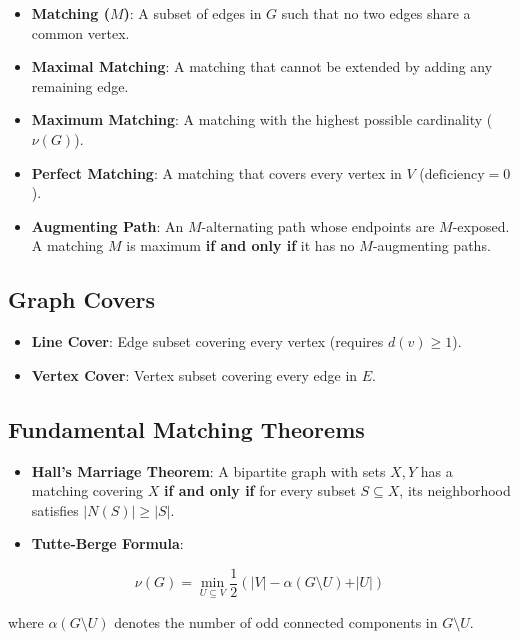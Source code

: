 \documentclass[
]{book}
\theoremstyle{definition}
\theoremstyle{definition}
\theoremstyle{definition}
\theoremstyle{definition}
\theoremstyle{remark}
\begin{document}
\begin{itemize}
\item
  \textbf{Matching (\(M\))}: A subset of edges in \(G\) such that no two edges share a common vertex.
\item
  \textbf{Maximal Matching}: A matching that cannot be extended by adding any remaining edge.
\item
  \textbf{Maximum Matching}: A matching with the highest possible cardinality (\(\nu(G)\)).
\item
  \textbf{Perfect Matching}: A matching that covers every vertex in \(V\) (\(\text{deficiency} = 0\)).
\item
  \textbf{Augmenting Path}: An \(M\)-alternating path whose endpoints are \(M\)-exposed. A matching \(M\) is maximum \textbf{if and only if} it has no \(M\)-augmenting paths.
\end{itemize}

\subsection{Graph Covers}\label{graph-covers}

\begin{itemize}
\item
  \textbf{Line Cover}: Edge subset covering every vertex (requires \(d(v) \ge 1\)).
\item
  \textbf{Vertex Cover}: Vertex subset covering every edge in \(E\).
\end{itemize}

\subsection{Fundamental Matching Theorems}\label{fundamental-matching-theorems}

\begin{itemize}
\item
  \textbf{Hall's Marriage Theorem}: A bipartite graph with sets \(X, Y\) has a matching covering \(X\) \textbf{if and only if} for every subset \(S \subseteq X\), its neighborhood satisfies \(\vert{}N(S)\vert{} \ge \vert{}S\vert{}\).
\item
  \textbf{Tutte-Berge Formula}:
\end{itemize}

\[\nu(G) = \min_{U \subseteq V} \frac{1}{2} \left( \vert{}V\vert{} - \alpha(G \setminus U) + \vert{}U\vert{} \right)\]

where \(\alpha(G \setminus U)\) denotes the number of odd connected components in \(G \setminus U\).
\end{document}
